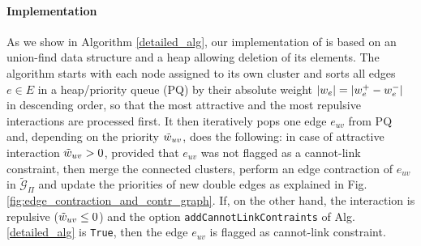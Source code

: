 \paragraph{Implementation} As we show in Algorithm \ref{detailed_alg}, our implementation of \algname{} is based on an union-find data structure and a heap allowing deletion of its elements. The algorithm starts with each node assigned to its own cluster and sorts all edges $e\in E$ in a heap/priority queue (PQ) by their absolute weight $|w_e|=|w_e^+ - w_e^-|$ in descending order, so that the most attractive and the most repulsive interactions are processed first. It then iteratively pops one edge $e_{uv}$ from PQ and, depending on the priority $\tilde{w}_{uv}$, does the following: in case of attractive interaction $\tilde{w}_{uv}>0$, provided that $e_{uv}$ was not flagged as a cannot-link constraint, then merge the connected clusters, perform an edge contraction of $e_{uv}$ in $\tilde{\mathcal{G}}_\Pi$ and update the priorities of new double edges as explained in Fig. \ref{fig:edge_contraction_and_contr_graph}. 
If, on the other hand, the interaction is repulsive ($\tilde{w}_{uv}\leq 0$) and the option \texttt{addCannotLinkContraints} of Alg. \ref{detailed_alg} is \texttt{True}, then the edge $e_{uv}$ is flagged as cannot-link constraint.


